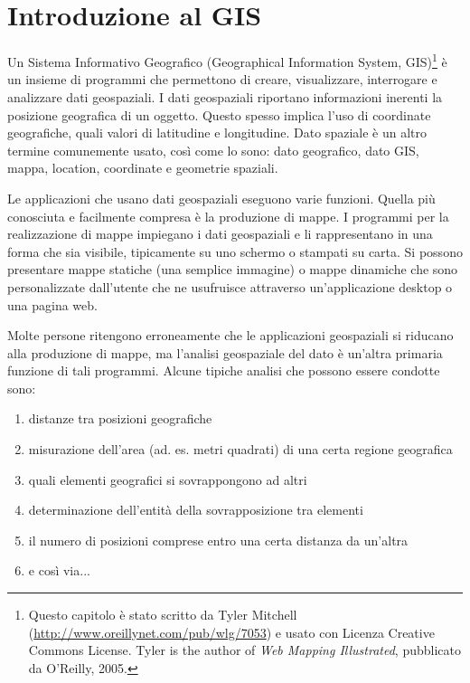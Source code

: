 
\section{Introduzione al GIS}\label{label_intro}


Un Sistema Informativo Geografico (Geographical Information System,
GIS)\cite{mitchel05}\footnote{Questo capitolo è stato scritto da Tyler
Mitchell (\url{http://www.oreillynet.com/pub/wlg/7053}) e usato con Licenza Creative Commons License. Tyler is the author of 
\textit{Web Mapping Illustrated}, pubblicato da O'Reilly, 2005.}
è un insieme di programmi che permettono di creare, visualizzare,
interrogare e analizzare dati geospaziali. I dati geospaziali riportano
informazioni inerenti la posizione geografica di un oggetto. Questo
spesso implica l'uso di coordinate geografiche, quali valori di latitudine
e longitudine. Dato spaziale è un altro termine comunemente usato,
così come lo sono: dato geografico, dato GIS, mappa, location,
coordinate e geometrie spaziali.

Le applicazioni che usano dati geospaziali eseguono varie funzioni.
Quella più conosciuta e facilmente compresa è la produzione di mappe.
I programmi per la realizzazione di mappe impiegano i dati geospaziali
e li rappresentano in una forma che sia visibile, tipicamente su uno
schermo o stampati su carta. Si possono presentare mappe statiche
(una semplice immagine) o mappe dinamiche che sono personalizzate
dall'utente che ne usufruisce attraverso un'applicazione desktop o una pagina web.

Molte persone ritengono erroneamente che le applicazioni geospaziali
si riducano alla produzione di mappe, ma l'analisi geospaziale del
dato è un'altra primaria funzione di tali programmi. Alcune tipiche
analisi che possono essere condotte sono:

\begin{enumerate}
\item distanze tra posizioni geografiche
\item misurazione dell'area (ad. es. metri quadrati) di una certa regione
geografica
\item quali elementi geografici si sovrappongono ad altri
\item determinazione dell'entità della sovrapposizione tra elementi
\item il numero di posizioni comprese entro una certa distanza da un'altra
\item e così via... 
\end{enumerate}

